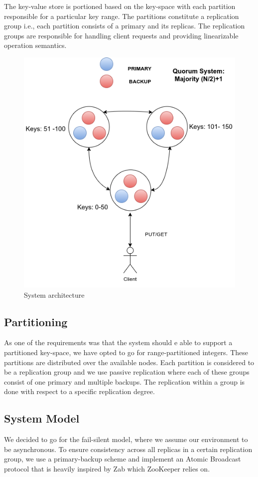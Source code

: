 \documentclass[12pt]{article}
\begin{document}
The key-value store is portioned based on the key-space with each partition responsible for a particular key range. The partitions constitute a replication group i.e., each partition consists of a primary and its replicas. The replication groups are responsible for handling client requests and providing linearizable operation semantics.
\begin{figure}[H]
  \centering
  \includegraphics[scale=0.6,clip]{img/architecture}
  \caption[Caption for LOF]{System architecture}  
  \label{fig:picture}
\end{figure} 

\subsection{Partitioning}
As one of the requirements was that the system should e able to support a partitioned key-space, we have opted to go for range-partitioned integers. These partitions are distributed over the available nodes. Each partition is considered to be a replication group and we use passive replication where each of these groups consist of one primary and multiple backups. The replication within a group is done with respect to a specific replication degree.

\subsection{System Model}
We decided to go for the fail-silent model, where we assume our environment to be asynchronous. To ensure consistency across all replicas in a certain replication group, we use a primary-backup scheme and implement an Atomic Broadcast protocol that is heavily inspired by Zab \cite{Junqueira:2011:ZHB:2056308.2056409} which ZooKeeper \cite{Hunt:2010:ZWC:1855840.1855851} relies on.
\end{document}
